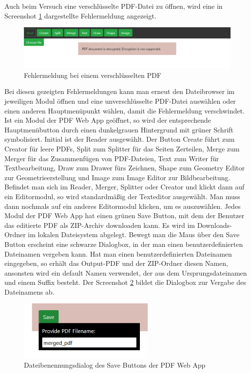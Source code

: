 Auch beim Versuch eine verschlüsselte PDF-Datei zu öffnen, wird eine in Screenshot \ref{fig:errorcrypt} dargestellte Fehlermeldung angezeigt.

\begin{figure}[!htbp]
	\centering
	\includegraphics[width=1\textwidth]{"images/errorcrypt.png"}
	\caption{Fehlermeldung bei einem verschlüsselten PDF}
	\label{fig:errorcrypt}
\end{figure}

Bei diesen gezeigten Fehlermeldungen kann man erneut den Dateibrowser im jeweiligen Modul öffnen und eine unverschlüsselte PDF-Datei auswählen oder einen anderen Hauptmenüpunkt wählen, damit die Fehlermeldung verschwindet. \\
Ist ein Modul der PDF Web App geöffnet, so wird der entsprechende Hauptmenübutton durch einen dunkelgrauen Hintergrund mit grüner Schrift symbolisiert. Initial ist der Reader ausgewählt. Der Button Create führt zum Creator für leere PDFs, Split zum Splitter für das Seiten Zerteilen, Merge zum Merger für das Zusammenfügen von PDF-Dateien, Text zum Writer für Textbearbeitung, Draw zum Drawer fürs Zeichnen, Shape zum Geometry Editor zur Geometrieerstellung und Image zum Image Editor zur Bildbearbeitung. Befindet man sich im Reader, Merger, Splitter oder Creator und klickt dann auf ein Editormodul, so wird standardmäßig der Texteditor ausgewählt. Man muss dann nochmals auf ein anderes Editormodul klicken, um es auszuwählen. Jedes Modul der PDF Web App hat einen grünen Save Button, mit dem der Benutzer das editierte PDF als ZIP-Archiv downloaden kann. Es wird im Downloads-Ordner im lokalen Dateisystem abgelegt. Bewegt man die Maus über den Save Button erscheint eine schwarze Dialogbox, in der man einen benutzerdefinierten Dateinamen vergeben kann. Hat man einen benutzerdefinierten Dateinamen eingegeben, so erhält das Output-PDF und der ZIP-Ordner diesen Namen, ansonsten wird ein default Namen verwendet, der aus dem Ursprungsdateinamen und einem Suffix besteht. Der Screenshot \ref{fig:save} bildet die Dialogbox zur Vergabe des Dateinamens ab. 

\begin{figure}[!htbp]
	\centering
	\includegraphics[width=0.6\textwidth]{"images/save.png"}
	\caption{Dateibenennungsdialog des Save Buttons der PDF Web App}
	\label{fig:save}
\end{figure}

